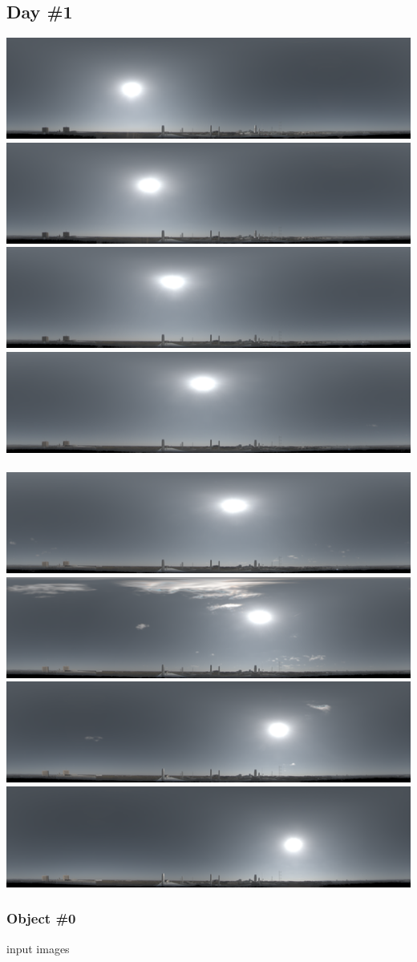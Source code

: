 \begin{center}

\hypertarget{day-1}{%
\subsection*{Day \#1}\label{day-1}}

\includegraphics[width=0.24\linewidth]{semisynthetic/20150514/094109.png}
\includegraphics[width=0.24\linewidth]{semisynthetic/20150514/103709.png}
\includegraphics[width=0.24\linewidth]{semisynthetic/20150514/113309.png}
\includegraphics[width=0.24\linewidth]{semisynthetic/20150514/122909.png}\\
~\\
\includegraphics[width=0.24\linewidth]{semisynthetic/20150514/132509.png}
\includegraphics[width=0.24\linewidth]{semisynthetic/20150514/142109.png}
\includegraphics[width=0.24\linewidth]{semisynthetic/20150514/151709.png}
\includegraphics[width=0.24\linewidth]{semisynthetic/20150514/161309.png}\\

\hypertarget{object-0}{%
\subsubsection*{Object \#0}\label{object-0}}

input images


\end{center}
